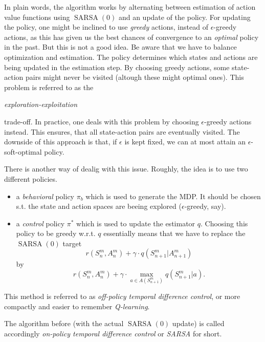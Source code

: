 In plain words, the algorithm works by alternating between estimation of action value functions using \( \operatorname{SARSA}(0) \) and an update of the policy. For updating the policy, one might be inclined to use \textit{greedy} actions, instead of \( \epsilon \)-greedy actions, as this has given us the best chances of convergence to an \textit{optimal} policy in the past. But this is not a good idea. Be aware that we have to balance optimization and estimation. The policy determines which states and actions are being updated in the estimation step. By choosing greedy actions, some state-action pairs might never be visited (altough these might optimal ones). This problem is referred to as the 
\begin{indented}
    \emph{exploration-exploitation}
\end{indented}
trade-off. In practice, one deals with this problem by choosing \( \epsilon \)-greedy actions instead. This ensures, that all state-action pairs are eventually visited. The downside of this approach is that, if \( \epsilon \) is kept fixed, we can at most attain an \( \epsilon \)-soft-optimal policy.


There is another way of dealig with this issue. Roughly, the idea is to use two different policies.

\begin{itemize}
    \item a \emph{behavioral} policy \( \pi_b \) which is used to generate the MDP. It should be chosen s.t. the state and action spaces are beeing explored (\( \epsilon \)-greedy, say).
    \item a  \emph{control} policy \( \pi^* \) which is used to update the estimator \( q \). Choosing this policy to be greedy w.r.t. \( q \) essentially means that we have to replace the \( \operatorname{SARSA}(0) \) target
    \[
        r(S_n^m, A_n^m) + \gamma \cdot q(S_{n+1}^m | A_{n+1}^m )
    \] 
    by 
    \[
         r(S_n^m, A_n^m) + \gamma \cdot \max_{a \in A(S_{n+1}^m)}q(S_{n+1}^m | a ).
    \]
\end{itemize}
This method is referred to as \emph{off-policy temporal difference control}, or more compactly and easier to remember \emph{Q-learning}.

The algorithm before (with the actual \( \operatorname{SARSA}(0) \) update) is called accordingly \emph{on-policy temporal difference control} or \emph{SARSA} for short.


